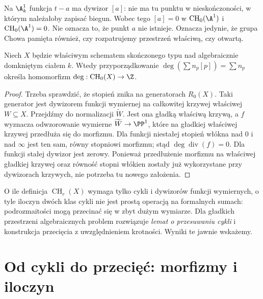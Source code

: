 \begin{przyklad}
\label{prz:ga7-a1-chow0}
Na $\A^1_k$ funkcja $t-a$ ma dywizor $[a]$:
nie ma tu punktu w nieskończoności, w którym należałoby
zapisać biegun. Wobec tego $[a]=0$ w
$\operatorname{CH}_0(\A^1)$ i $\operatorname{CH}_0(\A^1)=0$.
Nie oznacza to, że punkt $a$ nie istnieje. Oznacza jedynie,
że grupa Chowa pamięta również, czy rozpatrujemy przestrzeń
właściwą, czy otwartą.
\end{przyklad}

\begin{stwierdzenie}
\label{st:ga7-degree}
Niech $X$ będzie właściwym schematem skończonego typu nad
algebraicznie domkniętym ciałem $k$. Wtedy przyporządkowanie
$\deg(\sum n_p[p])=\sum n_p$ określa homomorfizm
$\deg:\operatorname{CH}_0(X)\to\Z$.
\end{stwierdzenie}
\begin{proof}
Trzeba sprawdzić, że stopień znika na generatorach
$R_0(X)$. Taki generator jest dywizorem funkcji
wymiernej na całkowitej krzywej właściwej $W\subseteq X$.
Przejdźmy do normalizacji $\widetilde W$.
Jest ona gładką właściwą krzywą, a $f$ wyznacza
odwzorowanie wymierne $\widetilde W\to\PP^1$, które
na gładkiej właściwej krzywej przedłuża się do morfizmu.
Dla funkcji niestałej stopień włókna nad $0$
i nad $\infty$ jest ten sam, równy stopniowi morfizmu;
stąd $\deg\operatorname{div}(f)=0$. Dla funkcji stałej
dywizor jest zerowy. Ponieważ przedłużenie morfizmu
na właściwej gładkiej krzywej oraz równość stopni włókien
zostały już wykorzystane przy dywizorach krzywych,
nie potrzeba tu nowego założenia.
\end{proof}

\begin{uwaga}
O ile definicja $\operatorname{CH}_r(X)$ wymaga tylko
cykli i dywizorów funkcji wymiernych, o tyle iloczyn dwóch
klas cykli nie jest prostą operacją na formalnych sumach:
podrozmaitości mogą przecinać się w zbyt dużym wymiarze.
Dla gładkich przestrzeni algebraicznych problem rozwiązuje
\emph{lemat o przesuwaniu cykli} i konstrukcja przecięcia
z uwzględnieniem krotności. Wyniki te jawnie wskażemy.
\end{uwaga}

\section{Od cykli do przecięć: morfizmy i iloczyn}
\label{sec:ga7-intersection}


